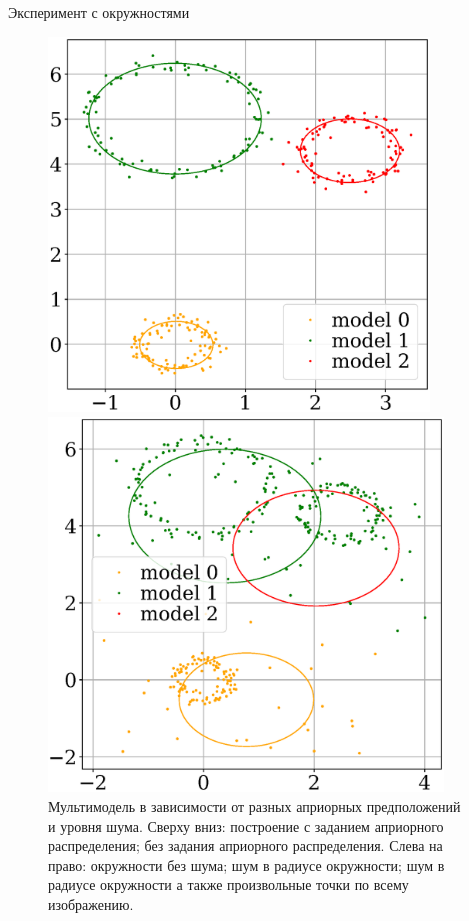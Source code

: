 \documentclass[10pt,pdf,hyperref={unicode}]{beamer}
\begin{document}
\begin{frame}{Эксперимент с окружностями}
\begin{figure}[h!]
\begin{minipage}{.32\textwidth}
\end{minipage}
\begin{minipage}{.32\textwidth}
\hspace{2mm}
      \includegraphics[width =  0.9\textwidth]{figures/911.eps}
\end{minipage}
\begin{minipage}{.32\textwidth}
\hspace{-2.3mm}
      \includegraphics[width =  0.935\textwidth]{figures/912.eps}
\end{minipage}
\caption{Мультимодель в зависимости от разных априорных предположений и уровня шума. Сверху вниз: построение с заданием априорного распределения; без задания априорного распределения. Слева на право: окружности без шума; шум в радиусе окружности; шум в радиусе окружности а также произвольные точки по всему изображению.}
\label{ce:fig3}
\end{figure}


\end{frame}
\end{document}
